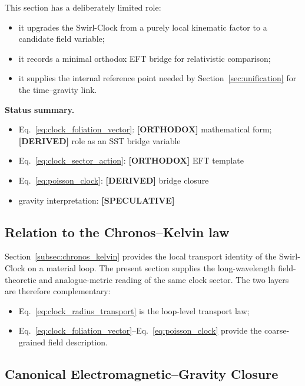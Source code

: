 \documentclass[11pt]{article}
\theoremstyle{definition}
\theoremstyle{plain}
\theoremstyle{remark}
\begin{document}
        This section has a deliberately limited role:
        \begin{itemize}
            \item it upgrades the Swirl-Clock from a purely local kinematic factor to a candidate field variable;
            \item it records a minimal orthodox EFT bridge for relativistic comparison;
            \item it supplies the internal reference point needed by Section~\ref{sec:unification} for the time--gravity link.
        \end{itemize}

        \textbf{Status summary.}
        \begin{itemize}
            \item Eq.~\eqref{eq:clock_foliation_vector}: \textbf{[ORTHODOX]} mathematical form; \textbf{[DERIVED]} role as an SST bridge variable
            \item Eq.~\eqref{eq:clock_sector_action}: \textbf{[ORTHODOX]} EFT template
            \item Eq.~\eqref{eq:poisson_clock}: \textbf{[DERIVED]} bridge closure
            \item gravity interpretation: \textbf{[SPECULATIVE]}
        \end{itemize}

    \subsection{Relation to the Chronos--Kelvin law}

        Section~\ref{subsec:chronos_kelvin} provides the local transport identity of the Swirl-Clock on a material loop. The present section supplies the long-wavelength field-theoretic and analogue-metric reading of the same clock sector. The two layers are therefore complementary:

        \begin{itemize}
            \item Eq.~\eqref{eq:clock_radius_transport} is the loop-level transport law;
            \item Eq.~\eqref{eq:clock_foliation_vector}--Eq.~\eqref{eq:poisson_clock} provide the coarse-grained field description.
        \end{itemize}


    \subsection{Canonical Electromagnetic--Gravity Closure}
        \label{subsec:canonical_em_gravity_closure}
\end{document}
